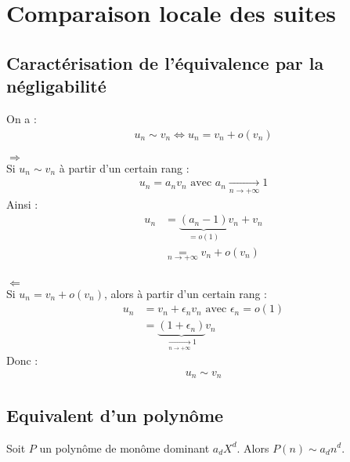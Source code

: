 \documentclass[../main.tex]{subfiles}
\begin{document}
\setcounter{chapter}{23}
\chapter{Comparaison locale des suites}
\tableofcontents
\clearpage

\section{Caractérisation de l'équivalence par la négligabilité}
\begin{tcolorbox}[title=Propostion 24.18, title filled=false, colframe=lightblue, colback=lightblue!10!white]
    On a : 
    \begin{align*}
        u_n \sim v_n \Leftrightarrow u_n = v_n + o(v_n)
    \end{align*}
\end{tcolorbox}

$\boxed{\Rightarrow}$ \\
Si $u_n \sim v_n$ à partir d'un certain rang : 
\begin{align*}
    u_n = a_n v_n \text{ avec } a_n \underset{n \to +\infty}{\longrightarrow} 1
\end{align*}
Ainsi : 
\begin{align*}
    u_n &= \underbrace{(a_n - 1)}_{= o(1)} v_n + v_n \\
    &\underset{n\to +\infty}{=} v_n + o(v_n)
\end{align*} \\

$\boxed{\Leftarrow}$ \\
Si $u_n = v_n + o(v_n)$, alors à partir d'un certain rang :
\begin{align*}
    u_n &= v_n + \epsilon_n v_n \text{ avec } \epsilon_n = o(1) \\
    &= \underbrace{(1 + \epsilon_n)}_{\underset{n \to +\infty}{\longrightarrow} 1} v_n
\end{align*}
Donc : 
\begin{align*}
    u_n \sim v_n
\end{align*}

\section{Equivalent d'un polynôme}
\begin{tcolorbox}[title=Propostion 24.20, title filled=false, colframe=lightblue, colback=lightblue!10!white]
    Soit $P$ un polynôme de monôme dominant $a_d X^d$. Alors $P(n) \sim a_d n^d$.
\end{tcolorbox}
\end{document}

